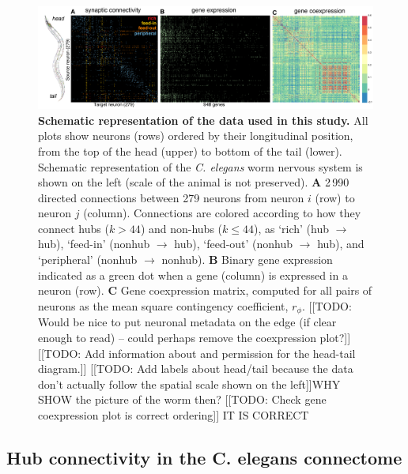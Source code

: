 \documentclass[10pt,letterpaper]{article}
\begin{document}
\begin{figure}[h]
  \centering
    \includegraphics[width=1\textwidth]{schematic.pdf}
 \caption{\textbf{Schematic representation of the data used in this study.}
All plots show neurons (rows) ordered by their longitudinal position, from the top of the head (upper) to bottom of the tail (lower).
Schematic representation of the \textit{C. elegans} worm nervous system is shown on the left (scale of the animal is not preserved).
 \textbf{A} 2\,990 directed connections between 279 neurons from neuron $i$ (row) to neuron $j$ (column).
Connections are colored according to how they connect hubs ($k > 44$) and non-hubs ($k \leq 44$), as `rich' (hub $\rightarrow$ hub), `feed-in' (nonhub $\rightarrow$ hub), `feed-out' (nonhub $\rightarrow$ hub), and `peripheral' (nonhub $\rightarrow$ nonhub).
  \textbf{B} Binary gene expression indicated as a green dot when a gene (column) is expressed in a neuron (row).
 \textbf{C} Gene coexpression matrix, computed for all pairs of neurons as the mean square contingency coefficient, $r_\phi$.
[[TODO: Would be nice to put neuronal metadata on the edge (if clear enough to read) -- could perhaps remove the coexpression plot?]]
[[TODO: Add information about and permission for the head-tail diagram.]]
[[TODO: Add labels about head/tail because the data don't actually follow the spatial scale shown on the left]]WHY SHOW the picture of the worm then?
[[TODO: Check gene coexpression plot is correct ordering]] IT IS CORRECT
}
\label{fig:SchematicRepresentation}
\end{figure}


\subsection*{Hub connectivity in the C. elegans connectome}
\end{document}
